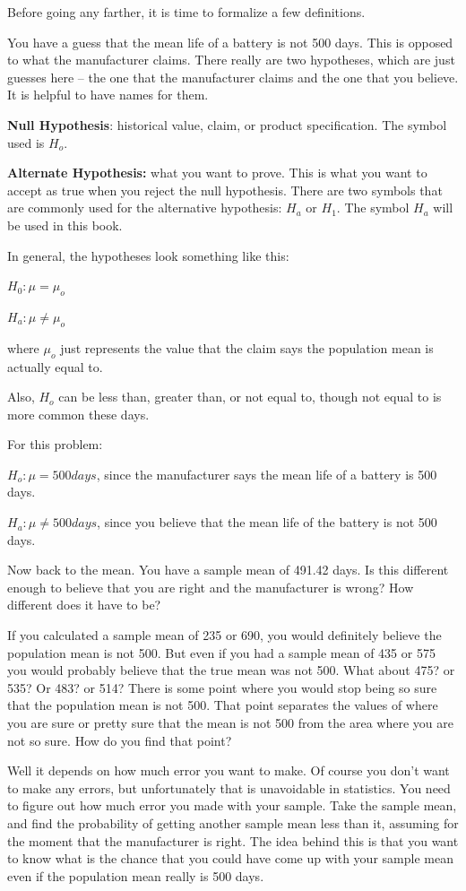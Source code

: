 \documentclass[
]{book}
\begin{document}
Before going any farther, it is time to formalize a few definitions.

You have a guess that the mean life of a battery is not 500 days. This is opposed to what the manufacturer claims. There really are two hypotheses, which are just guesses here -- the one that the manufacturer claims and the one that you believe. It is helpful to have names for them.

\textbf{Null Hypothesis}: historical value, claim, or product specification. The symbol used is \(H_o\).

\textbf{Alternate Hypothesis:} what you want to prove. This is what you want to accept as true when you reject the null hypothesis. There are two symbols that are commonly used for the alternative hypothesis: \(H_a\) or \(H_1\). The symbol \(H_a\) will be used in this book.

In general, the hypotheses look something like this:

\(H_0:\mu=\mu_o\)

\(H_a:\mu\ne \mu_o\)

where \(\mu_o\) just represents the value that the claim says the population mean is actually equal to.

Also, \(H_o\) can be less than, greater than, or not equal to, though not equal to is more common these days.

For this problem:

\(H_o:\mu=500days\), since the manufacturer says the mean life of a battery is 500 days.

\(H_a:\mu\ne 500days\), since you believe that the mean life of the battery is not 500 days.

Now back to the mean. You have a sample mean of 491.42 days. Is this different enough to believe that you are right and the manufacturer is wrong? How different does it have to be?

If you calculated a sample mean of 235 or 690, you would definitely believe the population mean is not 500. But even if you had a sample mean of 435 or 575 you would probably believe that the true mean was not 500. What about 475? or 535? Or 483? or 514? There is some point where you would stop being so sure that the population mean is not 500. That point separates the values of where you are sure or pretty sure that the mean is not 500 from the area where you are not so sure. How do you find that point?

Well it depends on how much error you want to make. Of course you don't want to make any errors, but unfortunately that is unavoidable in statistics. You need to figure out how much error you made with your sample. Take the sample mean, and find the probability of getting another sample mean less than it, assuming for the moment that the manufacturer is right. The idea behind this is that you want to know what is the chance that you could have come up with your sample mean even if the population mean really is 500 days.
\end{document}
